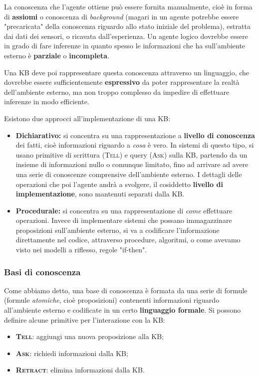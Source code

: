 \documentclass[a4paper,11pt]{article}
\begin{document}
La conoscenza che l'agente ottiene può essere fornita manualmente, cioè in forma di \textbf{assiomi} o conoscenza di \textit{background} (magari in un agente potrebbe essere "precaricata" della conoscenza riguardo allo stato iniziale del problema), estratta dai dati dei sensori, o ricavata dall'esperienza.
Un agente logico dovrebbe essere in grado di fare inferenze in quanto spesso le informazioni che ha sull'ambiente esterno  è \textbf{parziale} o \textbf{incompleta}.

Una KB deve poi rappresentare questa conoscenza attraverso un linguaggio, che dovrebbe essere sufficientemente \textbf{espressivo} da poter rappresentare la realtà dell'ambiente esterno, ma non troppo complesso da impedire di effettuare inferenze in modo efficiente. 

Esistono due approcci all'implementazione di una KB:
\begin{itemize}
	\item \textbf{Dichiarativo:} si concentra su una rappresentazione a \textbf{livello di conoscenza} dei fatti, cioè informazioni riguardo a \textit{cosa} è vero. In sistemi di questo tipo, si usano primitive di scrittura (\textsc{Tell}) e query (\textsc{Ask}) sulla KB, partendo da un insieme di informazioni nullo o comunque limitato, fino ad arrivare ad avere una serie di conoscenze comprensive dell'ambiente esterno. I dettagli delle operazioni che poi l'agente andrà a svolgere, il cosiddetto \textbf{livello di implementazione}, sono mantenuti separati dalla KB.
	\item \textbf{Procedurale:} si concentra su una rappresentazione di \textit{come} effettuare operazioni. Invece di implementare sistemi che possano immagazzinare proposizioni sull'ambiente esterno, si va a codificare l'informazione direttamente nel codice, attraverso procedure, algoritmi, o come avevamo visto nei modelli a riflesso, regole "if-then".
\end{itemize}

\subsubsection{Basi di conoscenza}
Come abbiamo detto, una base di conoscenza è formata da una serie di formule (formule \textit{atomiche}, cioè proposizioni) contenenti informazioni riguardo all'ambiente esterno e codificate in un certo \textbf{linguaggio formale}.
Si possono definire alcune primitive per l'interazione con la KB:
\begin{itemize}
	\item \textsc{\textbf{Tell}}: aggiungi una nuova proposizione alla KB;
	\item \textsc{\textbf{Ask}}: richiedi informazioni dalla KB;
	\item \textsc{\textbf{Retract}}: elimina informazioni dalla KB.
\end{itemize}
\end{document}
